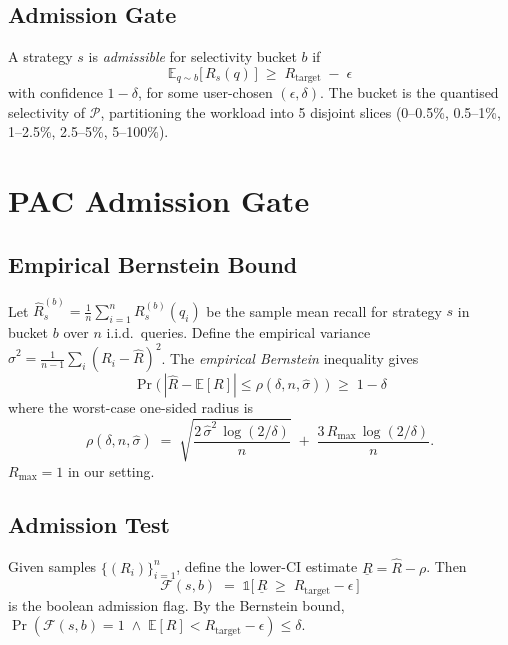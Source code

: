 \documentclass[conference]{IEEEtran}
\begin{document}
\subsection{Admission Gate}
A strategy $s$ is \emph{admissible} for selectivity bucket $b$ if
\begin{equation}
  \mathbb{E}_{q \sim b}\bigl[\,R_s(q)\,\bigr] \;\geq\; R_{\text{target}} \;-\; \epsilon
  \label{eq:admit}
\end{equation}
with confidence $1 - \delta$, for some user-chosen
$(\epsilon, \delta)$.  The bucket is the quantised selectivity of
$\mathcal{P}$, partitioning the workload into 5 disjoint slices
(0--0.5\%, 0.5--1\%, 1--2.5\%, 2.5--5\%, 5--100\%).

\section{PAC Admission Gate}
\label{sec:pac}

\subsection{Empirical Bernstein Bound}
Let $\hat R_s^{(b)} = \frac{1}{n} \sum_{i=1}^{n} R_s^{(b)}(q_i)$ be
the sample mean recall for strategy $s$ in bucket $b$ over $n$
i.i.d.\ queries.  Define the empirical variance
$\hat\sigma^2 = \frac{1}{n-1} \sum_i (R_i - \hat R)^2$.  The
\emph{empirical Bernstein} inequality gives
\begin{equation}
  \Pr\!\bigl(\,|\hat R - \mathbb{E}[R]| \leq \rho(\delta, n, \hat\sigma)\,\bigr)
  \;\geq\; 1 - \delta
\end{equation}
where the worst-case one-sided radius is
\begin{equation}
  \rho(\delta, n, \hat\sigma) \;=\;
  \sqrt{\frac{2\,\hat\sigma^2\,\log(2/\delta)}{n}}
  \;+\; \frac{3\,R_{\max}\,\log(2/\delta)}{n}.
  \label{eq:bernstein}
\end{equation}
$R_{\max} = 1$ in our setting.

\subsection{Admission Test}
Given samples $\{(R_i)\}_{i=1}^n$, define the lower-CI estimate
$\underline{R} = \hat R - \rho$.  Then
\begin{equation}
  \mathcal{F}(s, b) \;=\; \mathbb{1}\!\bigl[\,\underline{R} \;\geq\; R_{\text{target}} - \epsilon\,\bigr]
  \label{eq:gate}
\end{equation}
is the boolean admission flag.  By the Bernstein bound,
$\Pr(\mathcal{F}(s, b) = 1 \;\wedge\; \mathbb{E}[R] < R_{\text{target}} - \epsilon) \leq \delta$.
\end{document}
